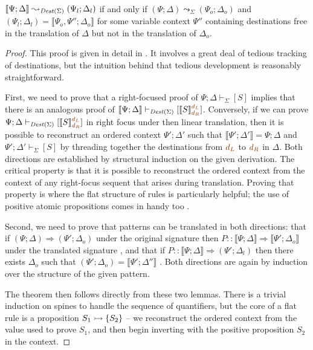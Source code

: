 \begin{theorem}~\\\label{thm:destcorrect}
$\llbracket \Psi; \Delta \rrbracket \leadsto_{{\it Dest}(\Sigma)}
 (\Psi_l; \Delta_l)$ if and only if 
$(\Psi; \Delta) \leadsto_\Sigma (\Psi_o; \Delta_o)$ and
$(\Psi_l; \Delta_l) = \llbracket \Psi_o, \Psi''; \Delta_o \rrbracket$ 
for some variable 
context $\Psi''$ containing destinations free in the translation of
$\Delta$ but not in the translation of $\Delta_o$.
\end{theorem}

\begin{proof}
  This proof is given in detail in \cite[Appendix
  A]{simmons11logical}. It involves a great deal of tedious tracking
  of destinations, but the intuition behind that tedious development
  is reasonably straightforward.

  First, we need to prove that a right-focused proof of $\Psi; \Delta
  \vdash_{\Sigma} [S]$ implies that there is an analogous proof of
  $\llbracket \Psi; \Delta \rrbracket \vdash_{{\it Dest}(\Sigma)} [
  \llbracket S \rrbracket^{\lf{d_L}}_{\lf{d_R}} ]$. Conversely,
  if we can prove $\Psi; \Delta \vdash_{{\it Dest}(\Sigma)} [\llbracket
  S \rrbracket^{\lf{d_L}}_{\lf{d_R}}]$ in right focus under then
  linear translation, then it is possible to reconstruct an ordered
  context $\Psi'; \Delta'$ such that $\llbracket \Psi'; \Delta'
  \rrbracket = \Psi; \Delta$ and $\Psi'; \Delta'
  \vdash_{\Sigma} [S]$ by threading together the destinations from
  $\lf{d_L}$ to $\lf{d_R}$ in $\Delta$. Both directions are established by
  structural induction on the given derivation. The critical property
  is that it is possible to reconstruct the ordered context from the
  context of any right-focus sequent that arises during translation.
  Proving that property is where the flat structure of rules is
  particularly helpful; the use of positive atomic propositions comes
  in handy too \cite[Lemma 1]{simmons11logical}.

  Second, we need to prove that patterns can be translated in both
  directions: that if $(\Psi; \Delta) \Longrightarrow (\Psi';
  \Delta_o)$ under the original signature then $P :: \llbracket \Psi;
  \Delta \rrbracket \Longrightarrow \llbracket \Psi'; \Delta_o \rrbracket$
  under the translated signature  \cite[Lemma 4]{simmons11logical}, and that if 
  $P :: \llbracket \Psi;
  \Delta \rrbracket \Longrightarrow (\Psi'; \Delta_l)$ then there 
  exists $\Delta_o$ such that 
  $(\Psi'; \Delta_o) = \llbracket \Psi'; \Delta'' \rrbracket$
  \cite[Lemma 5]{simmons11logical}. Both directions are again by induction
  over the structure of the given pattern.

  The theorem then follows directly from these two lemmas.  There
  is a trivial induction on spines to handle the sequence of
  quantifiers, but the core of a flat rule is a proposition $S_1
  \rightarrowtail \{ S_2 \}$ -- we reconstruct the ordered context from the
  value used to prove $S_1$, and then begin
  inverting with the positive proposition $S_2$ in the context.
\end{proof}


